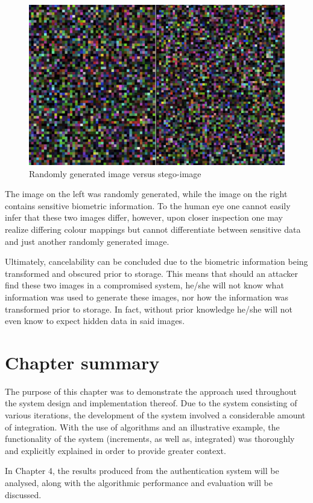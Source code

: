     
    \begin{figure}[htbp!] 
    \centering    
    \includegraphics[width=1.0\textwidth]{Chapter3/Figs/Figure3-7.png}
    \caption[Randomly generated image versus stego-image]{Randomly generated image versus stego-image}
    \label{fig:Randomly generated image versus stego-image}
    \end{figure}

The image on the left was randomly generated, while the image on the right contains sensitive biometric information. To the human eye one cannot easily infer that these two images differ, however, upon closer inspection one may realize differing colour mappings but cannot differentiate between sensitive data and just another randomly generated image.

Ultimately, cancelability can be concluded due to the biometric information being transformed and obscured prior to storage. This means that should an attacker find these two images in a compromised system, he/she will not know what information was used to generate these images, nor how the information was transformed prior to storage. In fact, without prior knowledge he/she will not even know to expect hidden data in said images.

\section{Chapter summary}

The purpose of this chapter was to demonstrate the approach used throughout the system design and implementation thereof. Due to the system consisting of various iterations, the development of the system involved a considerable amount of integration. With the use of algorithms and an illustrative example, the functionality of the system (increments, as well as, integrated) was thoroughly and explicitly explained in order to provide greater context. 

In Chapter 4, the results produced from the authentication system will be analysed, along with the algorithmic performance and evaluation will be discussed.

